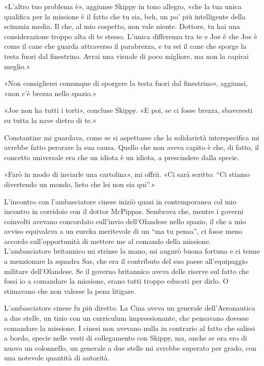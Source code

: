 «L'altro tuo problema è», aggiunse Skippy in tono allegro, «che la tua
unica qualifica per la missione è il fatto che tu sia, beh, un po' più
intelligente della scimmia media. Il che, al mio cospetto, non vale
niente. Dottore, tu hai una considerazione troppo alta di te stesso.
L'unica differenza tra te e Joe è che Joe è come il cane che guarda
attraverso il parabrezza, e tu sei il cane che sporge la testa fuori dal
finestrino. Avrai una visuale di poco migliore, ma non la capirai
meglio.»

«Non consiglierei comunque di sporgere la testa fuori dal finestrino»,
aggiunsi, «non c'è brezza nello spazio.»

«Joe non ha tutti i torti», concluse Skippy. «E poi, se ci fosse brezza,
sbaveresti su tutta la nave dietro di te.»

Constantine mi guardava, come se si aspettasse che la solidarietà
interspecifica mi avrebbe fatto perorare la sua causa. Quello che non
aveva capito è che, di fatto, il concetto universale era che un idiota è
un idiota, a prescindere dalla specie.

«Farò in modo di inviarle una cartolina», mi offrii. «Ci sarà scritto:
``Ci stiamo divertendo un mondo, lieto che lei non sia qui''.»

\hfill\break

L'incontro con l'ambasciatore cinese iniziò quasi in contemporanea col
mio incontro in corridoio con il dottor McPippas. Sembrava che, mentre i
governi coinvolti avevano concordato sull'invio dell'Olandese nello
spazio, il che a mio avviso equivaleva a un eureka meritevole di un ``ma
tu pensa'', ci fosse meno accordo sull'opportunità di mettere me al
comando della missione. L'ambasciatore britannico mi strinse la mano, mi
augurò buona fortuna e ci tenne a menzionare la squadra Sas, che era il
contributo del suo paese all'equipaggio militare dell'Olandese. Se il
governo britannico aveva delle riserve sul fatto che fossi io a
comandare la missione, erano tutti troppo educati per dirlo. O stimavano
che non valesse la pena litigare.

L'ambasciatore cinese fu più diretto. La Cina aveva un generale
dell'Aeronautica a due stelle, un tizio con un curriculum
impressionante, che pensavano dovesse comandare la missione. I cinesi
non avevano nulla in contrario al fatto che salissi a bordo, specie
nelle vesti di collegamento con Skippy, ma, anche se ora ero di nuovo un
colonnello, un generale a due stelle mi avrebbe superato per grado, con
una notevole quantità di autorità.

